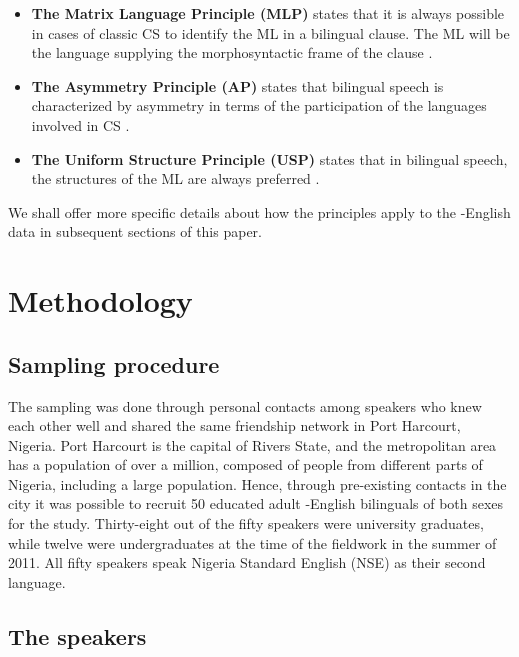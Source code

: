 \documentclass[output=paper]{langsci/langscibook}
\begin{document}
\begin{itemize}
 \item \textbf{The Matrix Language Principle (MLP)} states that it is always possible in cases of classic CS to identify the ML in a bilingual clause. The ML will be the language supplying the morphosyntactic frame of the clause \citep[8]{MyersScotton2002}. 

 \item \textbf{The Asymmetry Principle (AP)}  states that bilingual speech is characterized by asymmetry in terms of the participation of the languages involved in CS \citep[9]{MyersScotton2002}. 

 \item \textbf{The Uniform Structure Principle (USP)} states that in bilingual speech, the structures of the ML are always preferred \citep[8-9]{MyersScotton2002}.

\end{itemize}
 
We shall offer more specific details about how the principles apply to the -English data in subsequent sections of this paper.

\section{Methodology}\label{sec:ihemere:4}
\subsection{Sampling procedure}\label{sec:ihemere:4.1}

The sampling was done through personal contacts among speakers who knew each other well and shared the same friendship network in Port Harcourt, Nigeria. Port Harcourt is the capital of Rivers State, and the metropolitan area has a population of over a million, composed of people from different parts of Nigeria, including a large  population. Hence, through pre-existing contacts in the city it was possible to recruit 50 educated adult -English bilinguals of both sexes for the study. Thirty-eight out of the fifty speakers were university graduates, while twelve were undergraduates at the time of the fieldwork in the summer of 2011. All fifty speakers speak Nigeria Standard English (NSE) as their second language.

\subsection{The speakers}\label{sec:ihemere:4.2}
\end{document}
